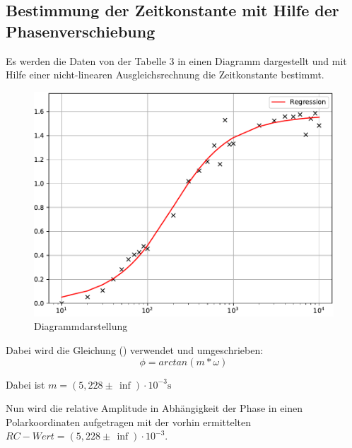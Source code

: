 \subsection{Bestimmung der Zeitkonstante mit Hilfe der Phasenverschiebung}
Es werden die Daten von der Tabelle 3 in einen Diagramm dargestellt und mit Hilfe
einer nicht-linearen Ausgleichsrechnung die Zeitkonstante bestimmt.

\begin{figure}[H]
  \centering
  \includegraphics[width=\textwidth]{Diagramm3.pdf}
  \caption{Diagrammdarstellung}
  \label{fig:3}
\end{figure}
Dabei wird die Gleichung () verwendet und umgeschrieben:
\begin{equation*}
  \phi= arctan(m*\omega)
\end{equation*}
\centerline{Dabei ist $m=(5,228 \pm \, \inf) \cdot 10^{-3} \si{\second}$}
Nun wird die relative Amplitude in Abhängigkeit der Phase in einen Polarkoordinaten aufgetragen mit
der vorhin ermittelten $RC-Wert = (5,228 \pm \, \inf) \cdot 10^{-3}$.
